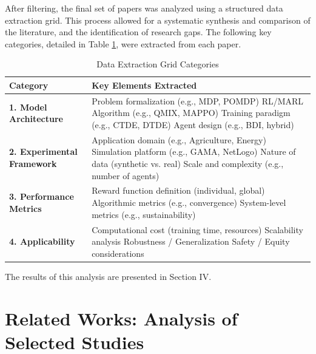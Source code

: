 \documentclass[conference]{IEEEtran}
\begin{document}
After filtering, the final set of papers was analyzed using a structured data extraction grid. This process allowed for a systematic synthesis and comparison of the literature, and the identification of research gaps. The following key categories, detailed in Table \ref{tab:grid}, were extracted from each paper.

\begin{table}[htbp]
\caption{Data Extraction Grid Categories}
\begin{center}
\begin{tabularx}{\columnwidth}{|l|X|}
\hline
\textbf{Category} & \textbf{Key Elements Extracted} \\
\hline
\textbf{1. Model Architecture} & 
Problem formalization (e.g., MDP, POMDP) \newline
RL/MARL Algorithm (e.g., QMIX, MAPPO) \newline
Training paradigm (e.g., CTDE, DTDE) \newline
Agent design (e.g., BDI, hybrid)
\\
\hline
\textbf{2. Experimental Framework} & 
Application domain (e.g., Agriculture, Energy) \newline
Simulation platform (e.g., GAMA, NetLogo) \newline
Nature of data (synthetic vs. real) \newline
Scale and complexity (e.g., number of agents)
\\
\hline
\textbf{3. Performance Metrics} & 
Reward function definition (individual, global) \newline
Algorithmic metrics (e.g., convergence) \newline
System-level metrics (e.g., sustainability)
\\
\hline
\textbf{4. Applicability} & 
Computational cost (training time, resources) \newline
Scalability analysis \newline
Robustness / Generalization \newline
Safety / Equity considerations
\\
\hline
\end{tabularx}
\label{tab:grid}
\end{center}
\end{table}

The results of this analysis are presented in Section IV.

\section{Related Works: Analysis of Selected Studies}
\end{document}
